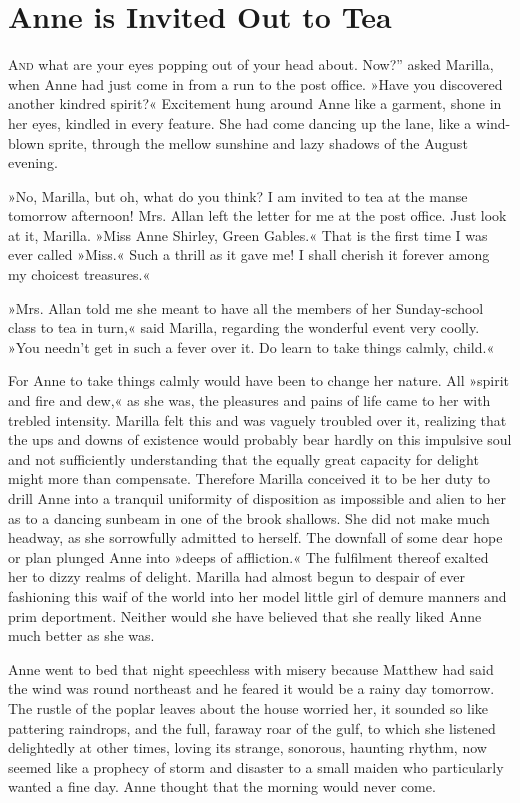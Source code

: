 \chapter{Anne is Invited Out to Tea}

\lettrine[ante=“,lines=4]{A}{nd} what are your eyes popping out of your head about. Now?” asked Marilla, when Anne had just come in from a run to the post office. »Have you discovered another kindred spirit?« Excitement hung around Anne like a garment, shone in her eyes, kindled in every feature. She had come dancing up the lane, like a wind-blown sprite, through the mellow sunshine and lazy shadows of the August evening.

»No, Marilla, but oh, what do you think? I am invited to tea at the manse tomorrow afternoon! Mrs. Allan left the letter for me at the post office. Just look at it, Marilla. »Miss Anne Shirley, Green Gables.« That is the first time I was ever called »Miss.« Such a thrill as it gave me! I shall cherish it forever among my choicest treasures.«

»Mrs. Allan told me she meant to have all the members of her Sunday-school class to tea in turn,« said Marilla, regarding the wonderful event very coolly. »You needn't get in such a fever over it. Do learn to take things calmly, child.«

For Anne to take things calmly would have been to change her nature. All »spirit and fire and dew,« as she was, the pleasures and pains of life came to her with trebled intensity. Marilla felt this and was vaguely troubled over it, realizing that the ups and downs of existence would probably bear hardly on this impulsive soul and not sufficiently understanding that the equally great capacity for delight might more than compensate. Therefore Marilla conceived it to be her duty to drill Anne into a tranquil uniformity of disposition as impossible and alien to her as to a dancing sunbeam in one of the brook shallows. She did not make much headway, as she sorrowfully admitted to herself. The downfall of some dear hope or plan plunged Anne into »deeps of affliction.« The fulfilment thereof exalted her to dizzy realms of delight. Marilla had almost begun to despair of ever fashioning this waif of the world into her model little girl of demure manners and prim deportment. Neither would she have believed that she really liked Anne much better as she was.

Anne went to bed that night speechless with misery because Matthew had said the wind was round northeast and he feared it would be a rainy day tomorrow. The rustle of the poplar leaves about the house worried her, it sounded so like pattering raindrops, and the full, faraway roar of the gulf, to which she listened delightedly at other times, loving its strange, sonorous, haunting rhythm, now seemed like a prophecy of storm and disaster to a small maiden who particularly wanted a fine day. Anne thought that the morning would never come.

